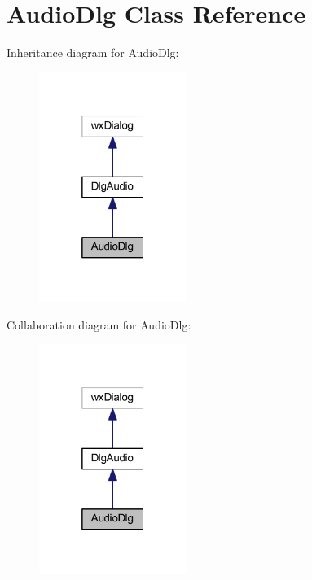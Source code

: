 \hypertarget{class_audio_dlg}{\section{Audio\-Dlg Class Reference}
\label{class_audio_dlg}
}


Inheritance diagram for Audio\-Dlg\-:\nopagebreak
\begin{figure}[H]
\begin{center}
\leavevmode
\includegraphics[width=136pt]{class_audio_dlg__inherit__graph}
\end{center}
\end{figure}


Collaboration diagram for Audio\-Dlg\-:\nopagebreak
\begin{figure}[H]
\begin{center}
\leavevmode
\includegraphics[width=136pt]{class_audio_dlg__coll__graph}
\end{center}
\end{figure}

